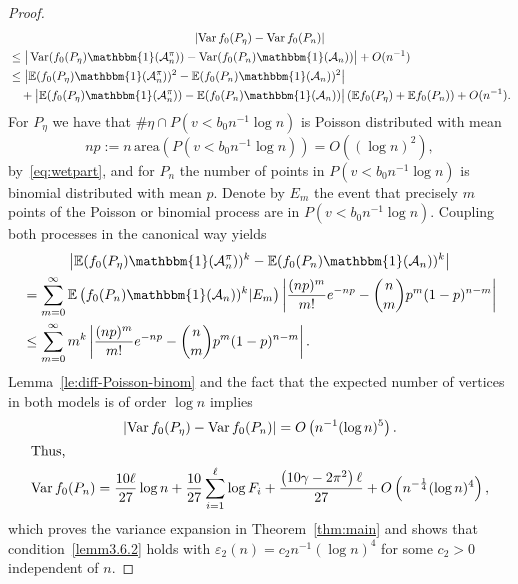 \documentclass[AHL,Unicode,longabstracts,published]{cedram}
\newcommand{\ind}{\mathbbm{1}}
\newcommand{\var}{\operatorname{Var}}
\newcommand{\bbE}{\mathbb{E}}
\newcommand{\clA}{\mathcal{A}}
\newcommand{\area}{\mathrm{area}}
\begin{document}
\begin{proof}
\begin{multline*}
\left| \var f_0(P_\eta)  - \var f_0(P_n)\right|\\
\begin{aligned}
&\leq  \big| \var (f_0(P_\eta) \ind(\clA^\pi_n)) - \var (f_0(P_n) \ind(\clA_n)) \big| + O(n^{-1})\\
&\leq \left| \bbE (f_0(P_\eta) \ind(\clA^\pi_n))^2 - \bbE (f_0(P_n) \ind(\clA_n))^2 \right|\\
& \quad + \big| \bbE (f_0(P_\eta) \ind(\clA^\pi_n)) - \bbE (f_0(P_n) \ind(\clA_n)) \big| \left(\bbE f_0(P_\eta) + \bbE f_0(P_n) \right) + O(n^{-1}).
\end{aligned}
\end{multline*}
For $P_\eta$ we have that $\# \eta \cap P(v< b_0 n^{-1} \log n)$ is Poisson distributed with mean
\[
np := n\, {\area}\left(P(v< b_0 n^{-1} \log n)\right) = O\left((\log n)^2\right),
\]
by~\eqref{eq:wetpart}, and for $P_n$ the number of points in $P(v< b_0 n^{-1} \log n)$ is binomial distributed with mean $p$. Denote by $E_m$ the event that precisely $m$ points of the Poisson or binomial process are in $P(v< b_0 n^{-1} \log n)$. Coupling both processes in the canonical way yields
\begin{multline*}
\big| \bbE (f_0(P_\eta) \ind(\clA^\pi_n))^k - \bbE (f_0(P_n) \ind(\clA_n))^k\big|
\\
\begin{aligned}
& =\sum_{m=0}^\infty \bbE \left(f_0(P_n) \ind(\clA_n))^k | E_m\right) \left|\frac {(np)^m}{m!} e^{-np} - \binom{n}{m} p^m (1-p)^{n-m} \right|
\\ & \leq
\sum_{m=0}^\infty m^k \left|\frac {(np)^m}{m!} e^{-np} - \binom{n}{m} p^m (1-p)^{n-m} \right|.
\end{aligned}
\end{multline*}
Lemma~\ref{le:diff-Poisson-binom} and the fact that the expected number of vertices in both models is of order $\log n$ implies
\begin{gather*}
\left| \var f_0(P_\eta) - \var f_0(P_n) \right|  = O\left(n^{-1} (\log n)^5\right).
\\
\intertext{Thus,}
\var f_0(P_n) = \frac{10 \ell}{27}\log n +\frac{10}{27}\sum_{i=1}^\ell \log F_i +\frac{\left(10 \gamma -2 \pi^2\right)\ell }{27} + O\left(n^{-\frac 14} (\log n)^4\right),
\end{gather*}
which proves the variance expansion in Theorem~\eqref{thm:main} and shows that condition~\eqref{lemm3.6.2} holds with $\varepsilon_2(n)=c_2 n^{-1} (\log n)^4$ for some $c_2>0$ independent of $n$.


\end{proof}
\end{document}
